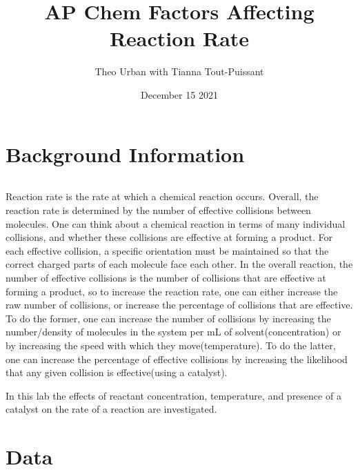 \documentclass{article}
\title{AP Chem Factors Affecting Reaction Rate}
\author{Theo Urban with Tianna Tout-Puissant}
\date{December 15 2021}
\begin{document}
\maketitle

\section{Background Information}
$\ $

Reaction rate is the rate at which a chemical reaction occurs. Overall, the reaction rate is determined by the number of effective collisions between molecules. One can think about a chemical reaction in terms of many individual collisions, and whether these collisions are effective at forming a product.  For each effective collision, a specific orientation must be maintained so that the correct charged parts of each molecule face each other. In the overall reaction, the number of effective collisions is the number of collisions that are effective at forming a product, so to increase the reaction rate, one can either increase the raw number of collisions, or increase the percentage of collisions that are effective.  To do the former, one can increase the number of collisions by increasing the number/density of molecules in the system per mL of solvent(concentration) or by increasing the speed with which they move(temperature).  To do the latter, one can increase the percentage of effective collisions by increasing the likelihood that any given collision is effective(using a catalyst).

In this lab the effects of reactant concentration, temperature, and presence of a catalyst on the rate of a reaction are investigated. 
\section{Data}
\end{document}
